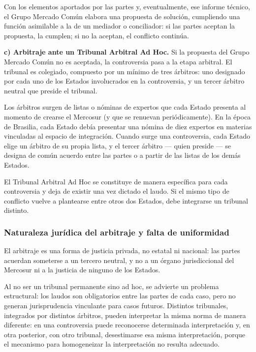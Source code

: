 \documentclass[12pt,oneside]{book}
\begin{document}
Con los elementos aportados por las partes y, eventualmente, ese informe técnico, el Grupo Mercado Común elabora una propuesta de solución, cumpliendo una función asimilable a la de un mediador o conciliador: si las partes aceptan la propuesta, la cumplen; si no la aceptan, el conflicto continúa.

\textbf{c) Arbitraje ante un Tribunal Arbitral Ad Hoc.} Si la propuesta del Grupo Mercado Común no es aceptada, la controversia pasa a la etapa arbitral. El tribunal es colegiado, compuesto por un mínimo de tres árbitros: uno designado por cada uno de los Estados involucrados en la controversia, y un tercer árbitro neutral que preside el tribunal.

Los árbitros surgen de listas o nóminas de expertos que cada Estado presenta al momento de crearse el Mercosur (y que se renuevan periódicamente). En la época de Brasilia, cada Estado debía presentar una nómina de diez expertos en materias vinculadas al espacio de integración. Cuando surge una controversia, cada Estado elige un árbitro de su propia lista, y el tercer árbitro --- quien preside --- se designa de común acuerdo entre las partes o a partir de las listas de los demás Estados.

\begin{important}
El Tribunal Arbitral Ad Hoc se constituye de manera específica para cada controversia y deja de existir una vez dictado el laudo. Si el mismo tipo de conflicto vuelve a plantearse entre otros dos Estados, debe integrarse un tribunal distinto.
\end{important}

\subsubsection{Naturaleza jurídica del arbitraje y falta de uniformidad}

El arbitraje es una forma de justicia privada, no estatal ni nacional: las partes acuerdan someterse a un tercero neutral, y no a un órgano jurisdiccional del Mercosur ni a la justicia de ninguno de los Estados.

Al no ser un tribunal permanente sino ad hoc, se advierte un problema estructural: los laudos son obligatorios entre las partes de cada caso, pero no generan jurisprudencia vinculante para casos futuros. Distintos tribunales, integrados por distintos árbitros, pueden interpretar la misma norma de manera diferente: en una controversia puede reconocerse determinada interpretación y, en otra posterior, con otro tribunal, desestimarse esa misma interpretación, porque el mecanismo para homogeneizar la interpretación no resulta adecuado.
\end{document}
